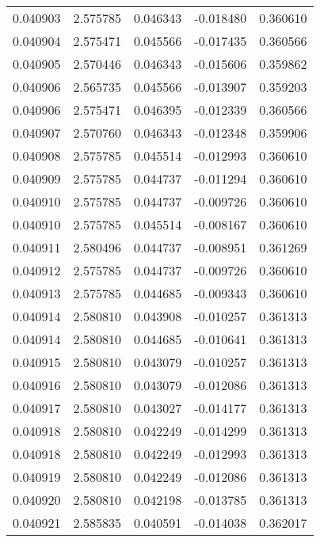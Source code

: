 \begin{tabular}{lrrrr}
0.040903    &  2.575785 &  0.046343 & -0.018480 &             0.360610 \\
0.040904    &  2.575471 &  0.045566 & -0.017435 &             0.360566 \\
0.040905    &  2.570446 &  0.046343 & -0.015606 &             0.359862 \\
0.040906    &  2.565735 &  0.045566 & -0.013907 &             0.359203 \\
0.040906    &  2.575471 &  0.046395 & -0.012339 &             0.360566 \\
0.040907    &  2.570760 &  0.046343 & -0.012348 &             0.359906 \\
0.040908    &  2.575785 &  0.045514 & -0.012993 &             0.360610 \\
0.040909    &  2.575785 &  0.044737 & -0.011294 &             0.360610 \\
0.040910    &  2.575785 &  0.044737 & -0.009726 &             0.360610 \\
0.040910    &  2.575785 &  0.045514 & -0.008167 &             0.360610 \\
0.040911    &  2.580496 &  0.044737 & -0.008951 &             0.361269 \\
0.040912    &  2.575785 &  0.044737 & -0.009726 &             0.360610 \\
0.040913    &  2.575785 &  0.044685 & -0.009343 &             0.360610 \\
0.040914    &  2.580810 &  0.043908 & -0.010257 &             0.361313 \\
0.040914    &  2.580810 &  0.044685 & -0.010641 &             0.361313 \\
0.040915    &  2.580810 &  0.043079 & -0.010257 &             0.361313 \\
0.040916    &  2.580810 &  0.043079 & -0.012086 &             0.361313 \\
0.040917    &  2.580810 &  0.043027 & -0.014177 &             0.361313 \\
0.040918    &  2.580810 &  0.042249 & -0.014299 &             0.361313 \\
0.040918    &  2.580810 &  0.042249 & -0.012993 &             0.361313 \\
0.040919    &  2.580810 &  0.042249 & -0.012086 &             0.361313 \\
0.040920    &  2.580810 &  0.042198 & -0.013785 &             0.361313 \\
0.040921    &  2.585835 &  0.040591 & -0.014038 &             0.362017 \\

\end{tabular}
